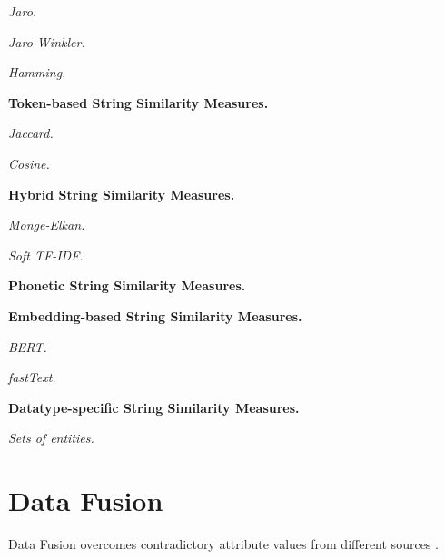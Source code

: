 
\textit{Jaro.}

\textit{Jaro-Winkler.}

\textit{Hamming.}

\textbf{Token-based String Similarity Measures.}


\textit{Jaccard.}

\textit{Cosine.}

\textbf{Hybrid String Similarity Measures.}

\textit{Monge-Elkan.}

\textit{Soft TF-IDF.}

\textbf{Phonetic String Similarity Measures.}

\textbf{Embedding-based String Similarity Measures.}

\textit{BERT.}

\textit{fastText.}

\textbf{Datatype-specific String Similarity Measures.}

\textit{Sets of entities.}

\section{Data Fusion}

Data Fusion overcomes contradictory attribute values from different sources \cite{Bleiholder2009DataF}.